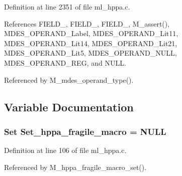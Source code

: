 Definition at line 2351 of file ml\_\-hppa.c.

References FIELD\_, FIELD\_, FIELD\_, M\_\-assert(), MDES\_\-OPERAND\_\-Label, MDES\_\-OPERAND\_\-Lit11, MDES\_\-OPERAND\_\-Lit14, MDES\_\-OPERAND\_\-Lit21, MDES\_\-OPERAND\_\-Lit5, MDES\_\-OPERAND\_\-NULL, MDES\_\-OPERAND\_\-REG, and NULL.

Referenced by M\_\-mdes\_\-operand\_\-type().

\subsection{Variable Documentation}
\subsubsection{\setlength{\rightskip}{0pt plus 5cm}\bf{Set} \bf{Set\_\-hppa\_\-fragile\_\-macro} = \bf{NULL}}\label{ml__hppa_8c_d79cc17391748e90c24f64d8479f3bf8}




Definition at line 106 of file ml\_\-hppa.c.

Referenced by M\_\-hppa\_\-fragile\_\-macro\_\-set().